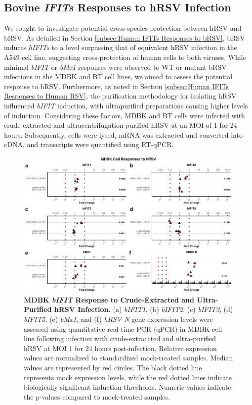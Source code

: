 \subsection{Bovine \textit{IFITs} Responses to hRSV Infection} \label{subsec:Bovine IFITs Responses to hRSV Infection}
We sought to investigate potential cross-species protection between hRSV and bRSV. As detailed in Section \ref{subsec:Human IFITs Responses to bRSV}, bRSV induces \textit{hIFITs} to a level surpassing that of equivalent hRSV infection in the A549 cell line, suggesting cross-protection of human cells to both viruses. While minimal \textit{bIFIT} or \textit{bMx1} responses were observed to WT or mutant bRSV infections in the MDBK and BT cell lines, we aimed to assess the potential response to hRSV. Furthermore, as noted in Section \ref{subsec:Human IFITs Responses to Human RSV}, the purification methodology for isolating hRSV influenced \textit{hIFIT} induction, with ultrapurified preparations causing higher levels of induction. Considering these factors, MDBK and BT cells were infected with crude extracted and ultracentrifugation-purified hRSV at an MOI of 1 for 24 hours. Subsequently, cells were lysed, mRNA was extracted and converted into cDNA, and transcripts were quantified using RT-qPCR.

\begin{figure}
    \centering
    \includegraphics[width=1\linewidth]{07. Chapter 2/Figs/02. Induction/07. mdbk_hrsv.pdf}
    \caption[MDBK \textit{bIFIT} Response to Crude-Extracted and Ultra-Purified hRSV Infection.]{\textbf{MDBK \textit{bIFIT} Response to Crude-Extracted and Ultra-Purified hRSV Infection.} (a) \textit{bIFIT1}, (b) \textit{bIFIT2}, (c) \textit{bIFIT3}, (d) \textit{bIFIT5}, (e) \textit{bMx1}, and (f) \textit{hRSV N} gene expression levels were assessed using quantitative real-time PCR (qPCR) in MDBK cell line following infection with crude-extraccted and ultra-purified hRSV at MOI 1 for 24 hours post-infection. Relative expression values are normalized to standardized mock-treated samples. Median values are represented by red circles. The black dotted line represents mock expression levels, while the red dotted lines indicate biologically significant induction thresholds. Numeric values indicate the p-values compared to mock-treated samples.}
    \label{fig:bIFIT responses to hRSV infection in MDBK}
\end{figure}

